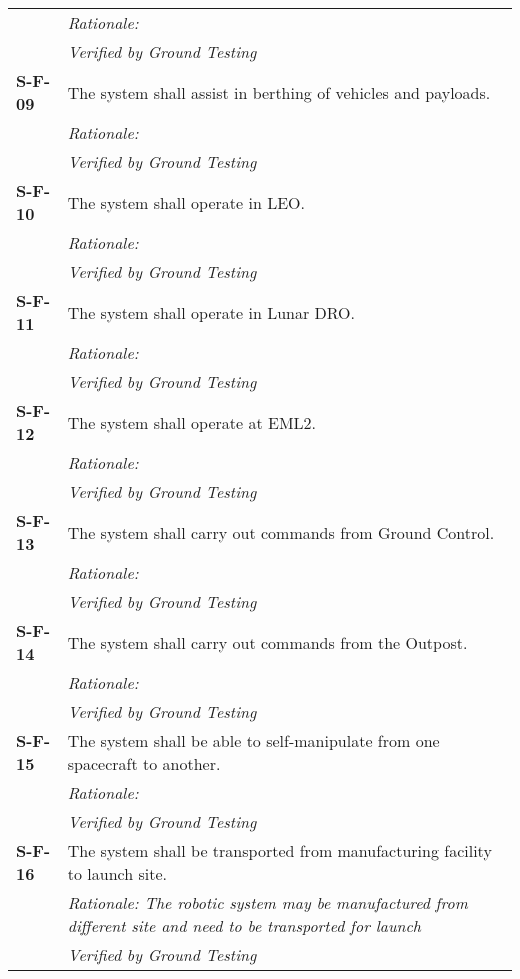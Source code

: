 \begin{longtable}{P{1.5cm}P{14.25cm}}
& \textit{Rationale: }	\\
& \textit{Verified by Ground Testing}	\\
\textbf{S-F-09}	& The system shall assist in berthing of vehicles and payloads. \\
& \textit{Rationale: }	\\
& \textit{Verified by Ground Testing}	\\
\textbf{S-F-10}	& The system shall operate in \gls{LEO}.\\ 
& \textit{Rationale: }	\\
& \textit{Verified by Ground Testing}	\\
\textbf{S-F-11}	& The system shall operate in Lunar \gls{DRO}. \\
& \textit{Rationale: }	\\
& \textit{Verified by Ground Testing}	\\
\textbf{S-F-12}	& The system shall operate at \gls{EML2}. \\ 
& \textit{Rationale: }	\\
& \textit{Verified by Ground Testing}	\\
\textbf{S-F-13}	& The system shall carry out commands from Ground Control. \\
& \textit{Rationale: }	\\
& \textit{Verified by Ground Testing}	\\
\textbf{S-F-14}	& The system shall carry out commands from the Outpost.\\
& \textit{Rationale: }	\\
& \textit{Verified by Ground Testing}	\\
\textbf{S-F-15}	& The system shall be able to self-manipulate from one spacecraft to another. \\
& \textit{Rationale: }	\\
& \textit{Verified by Ground Testing}	\\
\textbf{S-F-16}	& The system shall be transported from manufacturing facility to launch site.\\
& \textit{Rationale: The robotic system may be manufactured from different site and need to be transported for launch}	\\
& \textit{Verified by Ground Testing}	\\
\end{longtable}
